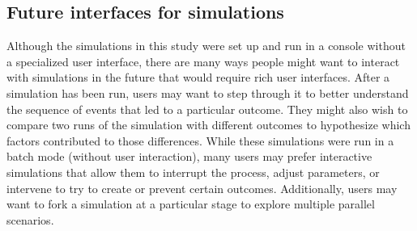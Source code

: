 


\subsection{Future interfaces for simulations}
Although the simulations in this study were set up and run in a console without a specialized user interface, there are many ways people might want to interact with simulations in the future that would require rich user interfaces. After a simulation has been run, users may want to step through it to better understand the sequence of events that led to a particular outcome. They might also wish to compare two runs of the simulation with different outcomes to hypothesize which factors contributed to those differences. While these simulations were run in a batch mode (without user interaction), many users may prefer interactive simulations that allow them to interrupt the process, adjust parameters, or intervene to try to create or prevent certain outcomes. Additionally, users may want to fork a simulation at a particular stage to explore multiple parallel scenarios.

